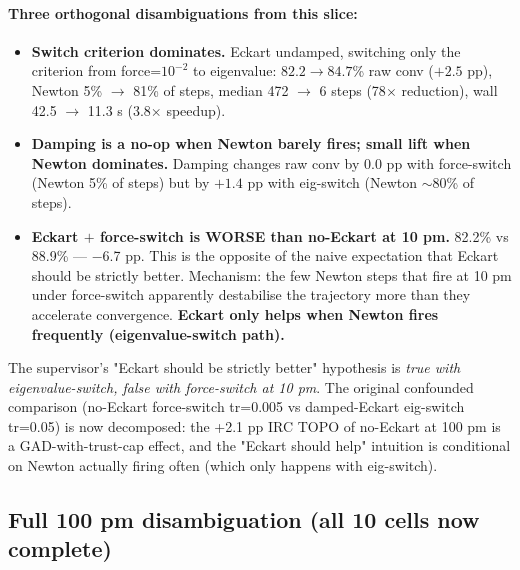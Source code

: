 \documentclass[11pt]{article}
\begin{document}
\paragraph{Three orthogonal disambiguations from this slice:}
\begin{itemize}[leftmargin=1.5em, itemsep=0.05em]
\item \textbf{Switch criterion dominates.} Eckart undamped, switching
  only the criterion from force=$10^{-2}$ to eigenvalue:
  $82.2 \to 84.7$\% raw conv ($+2.5$ pp), Newton 5\% $\to$ 81\% of
  steps, median 472 $\to$ 6 steps (78$\times$ reduction), wall
  42.5 $\to$ 11.3 s (3.8$\times$ speedup).
\item \textbf{Damping is a no-op when Newton barely fires; small lift
  when Newton dominates.} Damping changes raw conv by $0.0$ pp with
  force-switch (Newton 5\% of steps) but by $+1.4$ pp with eig-switch
  (Newton $\sim$80\% of steps).
\item \textbf{Eckart $+$ force-switch is WORSE than no-Eckart at 10
  pm.} 82.2\% vs 88.9\% --- $-$6.7 pp. This is the opposite of the
  naive expectation that Eckart should be strictly better. Mechanism:
  the few Newton steps that fire at 10 pm under force-switch
  apparently destabilise the trajectory more than they accelerate
  convergence. \textbf{Eckart only helps when Newton fires frequently
  (eigenvalue-switch path).}
\end{itemize}

The supervisor's "Eckart should be strictly better" hypothesis is
\emph{true with eigenvalue-switch, false with force-switch at 10 pm}.
The original confounded comparison (no-Eckart force-switch tr=0.005 vs
damped-Eckart eig-switch tr=0.05) is now decomposed: the +2.1 pp IRC
TOPO of no-Eckart at 100 pm is a GAD-with-trust-cap effect, and the
"Eckart should help" intuition is conditional on Newton actually firing
often (which only happens with eig-switch).

\subsection*{Full 100 pm disambiguation (all 10 cells now complete)}
\end{document}
